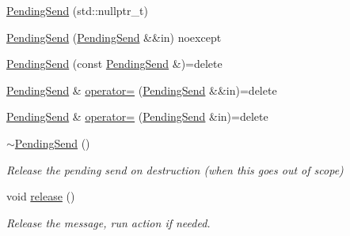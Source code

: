 \begin{DoxyCompactItemize}
\item 
\hyperlink{structvt_1_1messaging_1_1_pending_send_a129a9c509eacf26111013105affe5931}{Pending\+Send} (std\+::nullptr\+\_\+t)
\item 
\hyperlink{structvt_1_1messaging_1_1_pending_send_ab791376e86901943595c93cce9cefbf6}{Pending\+Send} (\hyperlink{structvt_1_1messaging_1_1_pending_send}{Pending\+Send} \&\&in) noexcept
\item 
\hyperlink{structvt_1_1messaging_1_1_pending_send_a951912c336cf3cdaf91f8ccde13092af}{Pending\+Send} (const \hyperlink{structvt_1_1messaging_1_1_pending_send}{Pending\+Send} \&)=delete
\item 
\hyperlink{structvt_1_1messaging_1_1_pending_send}{Pending\+Send} \& \hyperlink{structvt_1_1messaging_1_1_pending_send_aecef2d10d22564d142b9de52a57d81c8}{operator=} (\hyperlink{structvt_1_1messaging_1_1_pending_send}{Pending\+Send} \&\&in)=delete
\item 
\hyperlink{structvt_1_1messaging_1_1_pending_send}{Pending\+Send} \& \hyperlink{structvt_1_1messaging_1_1_pending_send_addfa1d51e3b8f272b5e711867e893bca}{operator=} (\hyperlink{structvt_1_1messaging_1_1_pending_send}{Pending\+Send} \&in)=delete
\item 
\hyperlink{structvt_1_1messaging_1_1_pending_send_ade803ff2903a92eaf62b6e330593871b}{$\sim$\+Pending\+Send} ()
\begin{DoxyCompactList}\small\item\em Release the pending send on destruction (when this goes out of scope) \end{DoxyCompactList}\item 
void \hyperlink{structvt_1_1messaging_1_1_pending_send_ad4b41412f953dcd22b3e3020a812f757}{release} ()
\begin{DoxyCompactList}\small\item\em Release the message, run action if needed. \end{DoxyCompactList}\end{DoxyCompactItemize}

